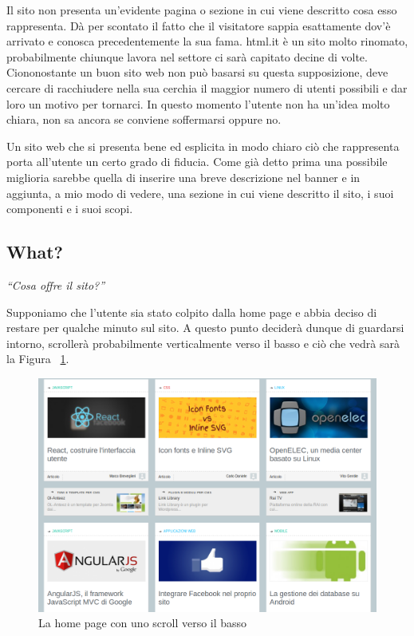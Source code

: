 Il sito non presenta un'evidente pagina o sezione in cui viene descritto cosa esso rappresenta. Dà per scontato il fatto che il visitatore sappia esattamente dov'è arrivato e conosca precedentemente la sua fama. html.it è un sito molto rinomato, probabilmente chiunque lavora nel settore ci sarà capitato decine di volte. Ciononostante un buon sito web non può basarsi su questa supposizione, deve cercare di racchiudere nella sua cerchia il maggior numero di utenti possibili e dar loro un motivo per tornarci. In questo momento l'utente non ha un'idea molto chiara, non sa ancora se conviene soffermarsi oppure no.

Un sito web che si presenta bene ed esplicita in modo chiaro ciò che rappresenta porta all'utente un certo grado di fiducia. Come già detto prima una possibile miglioria sarebbe quella di inserire una breve descrizione nel banner e in aggiunta, a mio modo di vedere, una sezione in cui viene descritto il sito, i suoi componenti e i suoi scopi.

\subsection{What?}

\begin{center}

\textit{``Cosa offre il sito?''}

\end{center}

Supponiamo che l'utente sia stato colpito dalla home page e abbia deciso di restare per qualche minuto sul sito. A questo punto deciderà dunque di guardarsi intorno, scrollerà probabilmente verticalmente verso il basso e ciò che vedrà sarà la Figura ~\ref{fig:f3}.

\begin{figure}[H]
\centering
\includegraphics[width=120mm]{images/screen1.png}
\caption{La home page con uno scroll verso il basso}
\label{fig:f3}
\end{figure}

